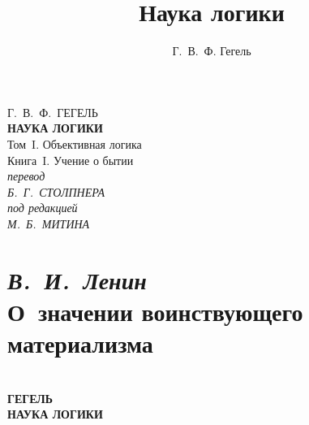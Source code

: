 \documentclass[b5paper, 11pt, twoside, onecolumn, openany]{memoir}
\author{Г.~В.~Ф. Гегель}
\title{Наука логики}
\date{}
\begin{document}
\frontmatter
\pagestyle{empty}

{\centering
  {\Large Г.~В.~Ф.~ГЕГЕЛЬ} \\
  \vspace{130pt}
  \textbf{\Huge НАУКА ЛОГИКИ} \\
  \vspace{60pt}
  {\Large Том~I. Объективная логика} \\
  \vspace{8pt}
  {\large Книга~I. Учение о бытии} \\
  \vspace{70pt}
  \textit{перевод} \\
  \textit{Б.~Г.~СТОЛПНЕРА} \\
  \vspace{10pt}
  \textit{под редакцией} \\
  \textit{М.~Б.~МИТИНА}
\par}

\clearpage

\pagestyle{plain}
\setcounter{page}{1}
\renewcommand{\parttitlefont}{\large}
\part[\normalsize{\em Ленин,} О~значении воинствующего материализма]%
     {{\em В.~И.~Ленин}\\{\bfseries О~значении воинствующего материализма}}


\cleardoublepage
\pagestyle{empty}

{\centering
  \ \\
  \vspace{50mm}
  {\huge\bfseries ГЕГЕЛЬ} \\
  \vspace{50mm}
  {\Huge\bfseries НАУКА ЛОГИКИ}
\par}


\end{document}
